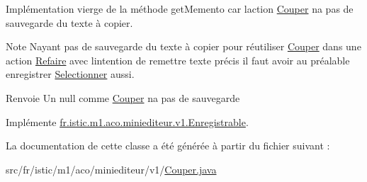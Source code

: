 Implémentation vierge de la méthode get\+Memento car l\textquotesingle{}action \hyperlink{classfr_1_1istic_1_1m1_1_1aco_1_1miniediteur_1_1v1_1_1Couper}{Couper} n\textquotesingle{}a pas de sauvegarde du texte à copier. 

\begin{DoxyNote}{Note}
N\textquotesingle{}ayant pas de sauvegarde du texte à copier pour réutiliser \hyperlink{classfr_1_1istic_1_1m1_1_1aco_1_1miniediteur_1_1v1_1_1Couper}{Couper} dans une action \hyperlink{classfr_1_1istic_1_1m1_1_1aco_1_1miniediteur_1_1v1_1_1Refaire}{Refaire} avec l\textquotesingle{}intention de remettre texte précis il faut avoir au préalable enregistrer \hyperlink{classfr_1_1istic_1_1m1_1_1aco_1_1miniediteur_1_1v1_1_1Selectionner}{Selectionner} aussi. 
\end{DoxyNote}
\begin{DoxyReturn}{Renvoie}
Un null comme \hyperlink{classfr_1_1istic_1_1m1_1_1aco_1_1miniediteur_1_1v1_1_1Couper}{Couper} n\textquotesingle{}a pas de sauvegarde 
\end{DoxyReturn}


Implémente \hyperlink{interfacefr_1_1istic_1_1m1_1_1aco_1_1miniediteur_1_1v1_1_1Enregistrable_aadf173c765d103d3924bbb688c45abb6}{fr.\+istic.\+m1.\+aco.\+miniediteur.\+v1.\+Enregistrable}.



La documentation de cette classe a été générée à partir du fichier suivant \+:\begin{DoxyCompactItemize}
\item 
src/fr/istic/m1/aco/miniediteur/v1/\hyperlink{Couper_8java}{Couper.\+java}\end{DoxyCompactItemize}
